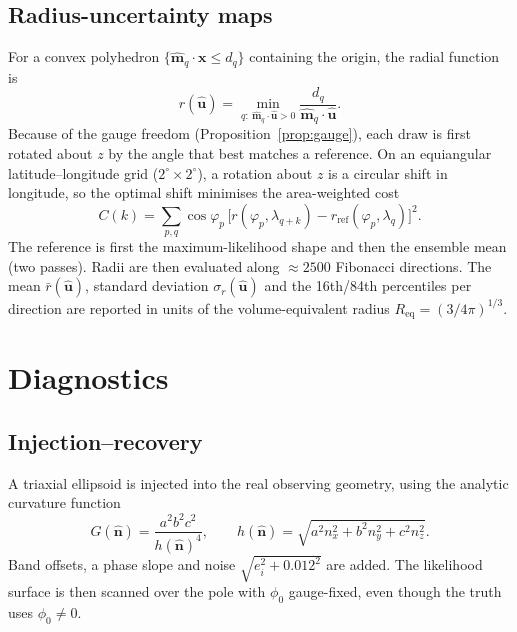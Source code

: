 \documentclass[11pt,a4paper]{article}
\theoremstyle{remark}
\newcommand{\vect}[1]{\bm{#1}}
\newcommand{\uv}[1]{\hat{\bm{#1}}}
\newcommand{\Req}{R_{\mathrm{eq}}}
\begin{document}
\subsection{Radius-uncertainty maps}
\label{sec:registration}
For a convex polyhedron $\{\uv m_q\cdot\vect x\le d_q\}$ containing the origin, the radial function is
\begin{equation}
  r(\uv u)=\min_{q:\ \uv m_q\cdot\uv u>0}\frac{d_q}{\uv m_q\cdot\uv u}.
\end{equation}
Because of the gauge freedom (Proposition~\ref{prop:gauge}), each draw is first rotated about $z$ by
the angle that best matches a reference. On an equiangular latitude--longitude grid
($2^\circ\times2^\circ$), a rotation about $z$ is a circular shift in longitude, so the optimal shift
minimises the area-weighted cost
\begin{equation}
  C(k)=\sum_{p,q}\cos\varphi_p\,\bigl[r(\varphi_p,\lambda_{q+k})-r_{\mathrm{ref}}(\varphi_p,\lambda_q)\bigr]^2 .
\end{equation}
The reference is first the maximum-likelihood shape and then the ensemble mean (two passes). Radii are
then evaluated along $\approx2500$ Fibonacci directions. The mean $\bar r(\uv u)$, standard deviation
$\sigma_r(\uv u)$ and the 16th/84th percentiles per direction are reported in units of the
volume-equivalent radius $\Req=(3/4\pi)^{1/3}$.

\section{Diagnostics}
\label{sec:diagnostics}

\subsection{Injection--recovery}
A triaxial ellipsoid is injected into the real observing geometry, using the analytic curvature
function
\begin{equation}
  G(\uv n)=\frac{a^2b^2c^2}{h(\uv n)^4},\qquad h(\uv n)=\sqrt{a^2n_x^2+b^2n_y^2+c^2n_z^2}.
\end{equation}
Band offsets, a phase slope and noise $\sqrt{e_i^2+0.012^2}$ are added. The likelihood surface is then
scanned over the pole with $\phi_0$ gauge-fixed, even though the truth uses $\phi_0\ne0$.
\end{document}
